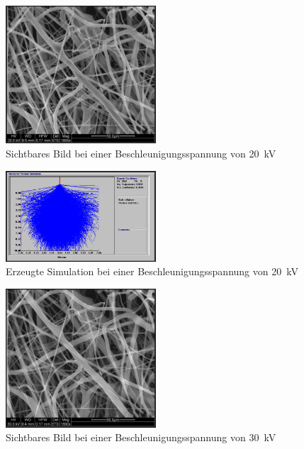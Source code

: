 \documentclass[12pt,english,ngerman]{scrartcl}
\begin{document}
\begin{figure}[H]
	\begin{center}
		\includegraphics[width =0.5\textwidth]{./figures/20kv.png}
	\end{center}
	\caption{Sichtbares Bild bei einer Beschleunigungsspannung von \SI{20}{\kilo\volt}}
    \label{fig:20kv}
\end{figure}

\begin{figure}[H]
	\begin{center}
		\includegraphics[width =0.5\textwidth]{./figures/simulation20kv.png}
	\end{center}
	\caption{Erzeugte Simulation bei einer Beschleunigungsspannung von \SI{20}{\kilo\volt} \cite{sein_foto}}
    \label{fig:simulation20kv}
\end{figure}



\begin{figure}[H]
	\begin{center}
		\includegraphics[width =0.5\textwidth]{./figures/30kv.png}
	\end{center}
	\caption{Sichtbares Bild bei einer Beschleunigungsspannung von \SI{30}{\kilo\volt}}
    \label{fig:30kv}
\end{figure}
\end{document}
